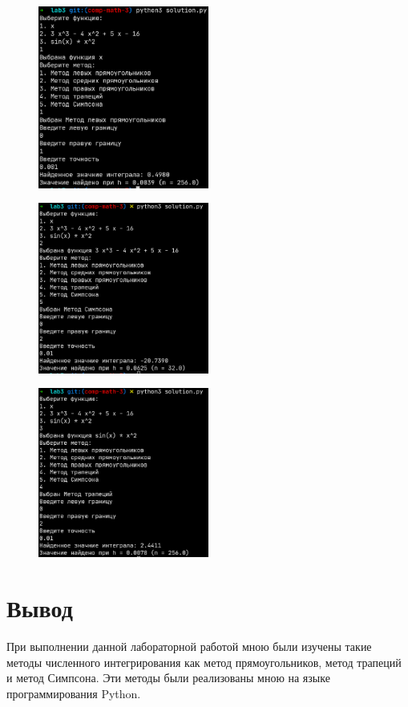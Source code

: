 \begin{figure}[H]
	\centering
	\includegraphics[width=0.5\textwidth]{./img/test1.png}
\end{figure}
\begin{figure}[H]
	\centering
	\includegraphics[width=0.5\textwidth]{./img/test2.png}
\end{figure}
\begin{figure}[H]
	\centering
	\includegraphics[width=0.5\textwidth]{./img/test3.png}
\end{figure}

\section{Вывод}
При выполнении данной лабораторной работой мною были
изучены такие методы численного интегрирования как
метод прямоугольников, метод трапеций и метод Симпсона.
Эти методы были реализованы мною на языке программирования
Python.
